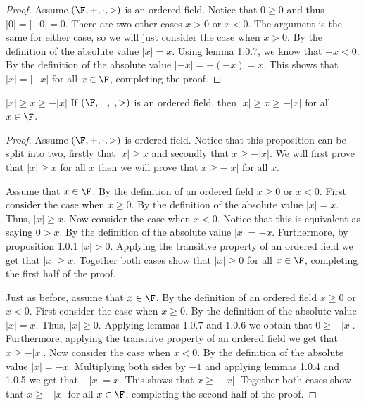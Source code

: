 \documentclass{report}
\begin{document}
\begin{proof}
  Assume $\left(\F, +, \cdot, >\right)$ is an ordered field.
  Notice that $0 \geq 0$ and thus $|0| = |-0| = 0$.
  There are two other cases $x > 0$ or $x < 0$.
  The argument is the same for either case, so we will just consider the case when $x > 0$.
  By the definition of the absolute value $|x| = x$.
  Using lemma 1.0.7, we know that $-x < 0$.
  By the definition of the absolute value $|-x| = -(-x) = x$.
  This shows that $|x| = |-x|$ for all $x \in \F$, completing the proof.
\end{proof}

\begin{proposition}{$|x| \geq x \geq -|x|$}{}
  If $\left(\F, +, \cdot, >\right)$ is an ordered field,
  then $|x| \geq x \geq -|x|$ for all $x \in \F$.
\end{proposition}

\begin{proof}
  Assume $\left(\F, +, \cdot, >\right)$ is ordered field.
  Notice that this proposition can be split into two, firstly that $|x| \geq x$ and secondly that $x \geq -|x|$.
  We will first prove that $|x| \geq x$ for all $x$ then we will prove that $x \geq -|x|$ for all $x$.

  Assume that $x \in \F$.
  By the definition of an ordered field $x \geq 0$ or $x < 0$.
  First consider the case when $x \geq 0$.
  By the definition of the absolute value $|x| = x$.
  Thus, $|x| \geq x$.
  Now consider the case when $x < 0$.
  Notice that this is equivalent as saying $0 > x$.
  By the definition of the absolute value $|x| = -x$.
  Furthermore, by proposition 1.0.1 $|x| > 0$.
  Applying the transitive property of an ordered field we get that $|x| \geq x$.
  Together both cases show that $|x| \geq 0$ for all $x \in \F$, completing the first half of the proof.

  Just as before, assume that $x \in \F$.
  By the definition of an ordered field $x \geq 0$ or $x < 0$.
  First consider the case when $x \geq 0$.
  By the definition of the absolute value $|x| = x$.
  Thus, $|x| \geq 0$.
  Applying lemmas 1.0.7 and 1.0.6 we obtain that $0 \geq -|x|$.
  Furthermore, applying the transitive property of an ordered field we get that $x \geq -|x|$.
  Now consider the case when $x < 0$.
  By the definition of the absolute value $|x| = -x$.
  Multiplying both sides by $-1$ and applying lemmas 1.0.4 and 1.0.5 we get that $-|x| = x$.
  This shows that $x \geq -|x|$.
  Together both cases show that $x \geq -|x|$ for all $x \in \F$, completing the second half of the proof.
\end{proof}
\end{document}
